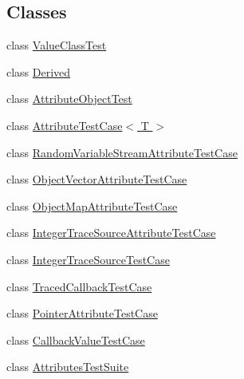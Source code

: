 \subsection*{Classes}
\begin{DoxyCompactItemize}
\item 
class \hyperlink{classValueClassTest}{Value\+Class\+Test}
\item 
class \hyperlink{classDerived}{Derived}
\item 
class \hyperlink{classAttributeObjectTest}{Attribute\+Object\+Test}
\item 
class \hyperlink{classAttributeTestCase}{Attribute\+Test\+Case$<$ T $>$}
\item 
class \hyperlink{classRandomVariableStreamAttributeTestCase}{Random\+Variable\+Stream\+Attribute\+Test\+Case}
\item 
class \hyperlink{classObjectVectorAttributeTestCase}{Object\+Vector\+Attribute\+Test\+Case}
\item 
class \hyperlink{classObjectMapAttributeTestCase}{Object\+Map\+Attribute\+Test\+Case}
\item 
class \hyperlink{classIntegerTraceSourceAttributeTestCase}{Integer\+Trace\+Source\+Attribute\+Test\+Case}
\item 
class \hyperlink{classIntegerTraceSourceTestCase}{Integer\+Trace\+Source\+Test\+Case}
\item 
class \hyperlink{classTracedCallbackTestCase}{Traced\+Callback\+Test\+Case}
\item 
class \hyperlink{classPointerAttributeTestCase}{Pointer\+Attribute\+Test\+Case}
\item 
class \hyperlink{classCallbackValueTestCase}{Callback\+Value\+Test\+Case}
\item 
class \hyperlink{classAttributesTestSuite}{Attributes\+Test\+Suite}
\end{DoxyCompactItemize}
